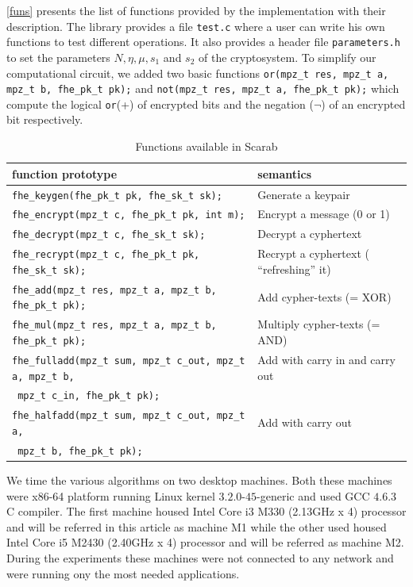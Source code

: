 \documentclass{acm_proc_article-sp}
\begin{document}
\autoref{funs} presents the list of functions provided by the implementation with their description. The library provides a file \texttt{test.c} where a user can write his own functions to test different operations. It also provides a header file \texttt{parameters.h} to set the parameters $N, \eta, \mu, s_1$ and $ s_2$ of the cryptosystem. To simplify our computational circuit, we added two basic functions \texttt{or(mpz\_t res, mpz\_t a, mpz\_t b, fhe\_pk\_t pk);} and \texttt{not(mpz\_t res, mpz\_t a, fhe\_pk\_t pk);} which compute the logical \texttt{or}(+) of encrypted bits and the negation ($\neg$) of an encrypted bit respectively.

\begin{table}
\centering
\caption{Functions available in Scarab}
\begin{tabular}{|l|l||}
  \hline
  \textbf{function prototype} & \textbf{semantics}  \\
  \hline
 \texttt{fhe\_keygen(fhe\_pk\_t pk, fhe\_sk\_t sk);}  & 	Generate a keypair \\
\texttt{fhe\_encrypt(mpz\_t c, fhe\_pk\_t pk, int m);} &	Encrypt a message (0 or 1) \\
\texttt{fhe\_decrypt(mpz\_t c, fhe\_sk\_t sk);} &	Decrypt a cyphertext\\
\texttt{fhe\_recrypt(mpz\_t c, fhe\_pk\_t pk, fhe\_sk\_t sk); }	&Recrypt a cyphertext ( ``refreshing'' it) \\
\texttt{fhe\_add(mpz\_t res, mpz\_t a, mpz\_t b, fhe\_pk\_t pk);} &	Add cypher-texts (= XOR) \\
\texttt{fhe\_mul(mpz\_t res, mpz\_t a, mpz\_t b, fhe\_pk\_t pk);} &	Multiply cypher-texts (= AND) \\
\texttt{fhe\_fulladd(mpz\_t sum, mpz\_t c\_out, mpz\_t a, mpz\_t b,} &	Add with carry in and carry out \\
\phantom{x}\hspace{12ex} \texttt{ mpz\_t c\_in, fhe\_pk\_t pk);} & \\
\texttt{fhe\_halfadd(mpz\_t sum, mpz\_t c\_out, mpz\_t a,} &	Add with carry out \\
\phantom{x}\hspace{12ex} \texttt{ mpz\_t b, fhe\_pk\_t pk);} & \\  
\hline
\end{tabular}
\label{funs}
\end{table}

We time the various algorithms on two desktop machines. Both these machines were x86-64 platform running Linux kernel $3.2.0$-$45$-generic  and used GCC $4.6.3$ C compiler.  The first machine housed Intel Core i3 M330 (2.13GHz x 4) processor and will be referred in this article as machine M1 while the other used  housed Intel Core i5 M2430 (2.40GHz x 4) processor and will be referred as machine M2. During the experiments these machines were not connected to any network and were running ony the most needed applications.
 
\end{document}

